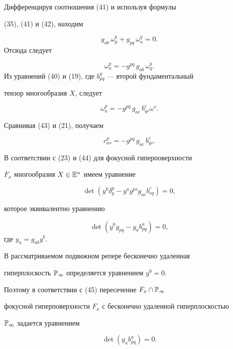 Дифференцируя соотношения (41) и используя формулы


(35), (41) и (42), находим


$$


g_{ab}\, \omega_p^b + g_{pq}\, \omega_a^q = 0.


$$
Отсюда следует


$$


\omega_a^p = -g^{pq}\, g_{ab}\, \omega_q^b.


$$
Из уравнений (40) и (19), где $b^q_{pq}$  --- второй фундаментальный


тензор многообразия $X$, следует


\begin{equation}\label{eq:63}
\omega_a^p = -g^{pq}\, g_{ac} \, b_{qs}^c \omega^s.
\end{equation}


Сравнивая (43) и (21), получаем


\begin{equation}\label{eq:64}
c_{as}^p = -g^{pq} \,g_{ac} \,b_{qs}^c.
\end{equation}



В соответствии с (23) и (44) для фокусной гиперповерхности


$F_x$ многообразия $X \in \Bbb{E}^n$ имеем уравнение


$$


\det (y^0 \delta_q^p - y^a g^{ps} g_{ac} b_{sq}^c) = 0,


$$


которое эквивалентно уравнению


\begin{equation}\label{eq:65}
\det (y^0 g_{pq} - y_a b_{p q}^a) = 0,
\end{equation}
где $y_a = g_{ab} y^b$.





В рассматриваемом подвижном репере бесконечно удаленная


гиперплоскость $\Bbb{P}_\infty$ определяется уравнением $y^0 = 0$.


Поэтому в соответствии с (45) пересечение $F_x \cap \Bbb{P}_\infty$


фокусной гиперповерхности $F_x$ с бесконечно удаленной гиперплоскостью


$\Bbb{P}_\infty$ задается уравнением


\begin{equation}\label{eq:66}
\det (y_a b_{p q}^a) = 0.
\end{equation}


